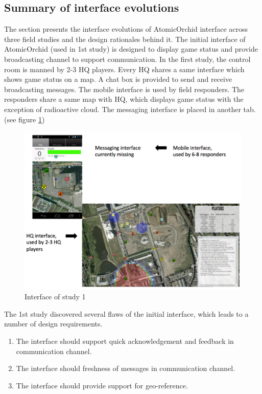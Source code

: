 \subsection{Summary of interface evolutions}\label{sec:conclusionIE}
The section presents the interface evolutions of AtomicOrchid interface across three field studies and the design rationales behind it. The initial interface of AtomicOrchid (used in 1st study) is designed to display game status and provide broadcasting channel to support communication. In the first study, the control room is manned by 2-3 HQ players. Every HQ shares a same interface which shows game status on a map. A chat box is provided to send and receive broadcasting messages. The mobile interface is used by field responders. The responders share a same map with HQ, which displays game status with the exception of radioactive cloud. The messaging interface is placed in another tab.(see figure \ref{fig:study1interface})\\ 



\begin{figure}[H]
  \centering
  \includegraphics[width=1\textwidth]{img/conclusion/study1interface}
  \caption{Interface of study 1}
  \label{fig:study1interface}
\end{figure}


The 1st study discovered several flaws of the initial interface, which leads to a number of design requirements. 

\begin{enumerate}
	 \item The interface should support quick acknowledgement and feedback in communication channel.
	 \item The interface should freshness of messages in communication channel.
	 \item The interface should provide support for geo-reference.
\end{enumerate}


